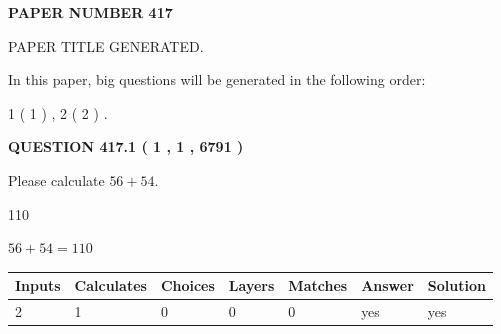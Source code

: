 \documentclass[12pt]{article}
\begin{document}
   
   
   
 {\textbf{ \Large{ PAPER NUMBER  417  }}}
   
   
\vspace{0.2in}
   
   
   
   
   
   
   
   
 \vspace{0.2in}
 
 
 
 
   
   
 PAPER TITLE GENERATED.
   
   
   
\vspace{0.2in}
   
In this paper, big questions will be generated in the following order: 
   
   
   1 ( 1 )
 ,
   2 ( 2 )
 .
  
\vspace{0.2in}
  
{\textbf{\Large{QUESTION
417.1 
 ( 1 , 1 , 6791 )
}}}
  
  
 
Please calculate $ %
56 +  %
54 $.
 
 
 
\noindent{}
 
 

110
 
 
\noindent{}
 
 

 
 
 
\noindent{}
 
 

$ %
56 +  %
54=   %
110$
 
 
\noindent{}
 
 

 
   
   
   
   
\noindent\begin{tabular}{|l|l|l|l|l|l|l|}
 \hline
Inputs & Calculates & Choices & Layers & Matches & Answer & Solution \\ \hline
 2  & 
 1  & 
 0
  & 
 0  & 
 0  & 
  yes & 
  yes 
  \\ \hline
 \end{tabular}
   
\end{document}
